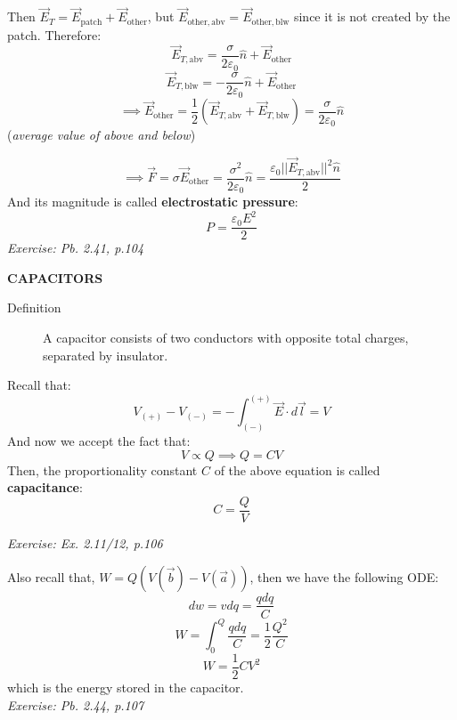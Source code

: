\documentclass[12pt,a4paper,twoside]{article}
\numberwithin{equation}{section}
\begin{document}
    \noindent Then \(\overrightarrow{E}_T=\overrightarrow{E}_{\mathrm{patch}}+\overrightarrow{E}_{\mathrm{other}}\), but \(\overrightarrow{E}_{\mathrm{other,abv}}=\overrightarrow{E}_{\mathrm{other,blw}}\) since it is not created by the patch. Therefore:
    \[\overrightarrow{E}_{T,\mathrm{abv}}=\frac{\sigma}{2\varepsilon_0}\hat{n}+\overrightarrow{E}_{\mathrm{other}}\]
    \[\overrightarrow{E}_{T,\mathrm{blw}}=-\frac{\sigma}{2\varepsilon_0}\hat{n}+\overrightarrow{E}_{\mathrm{other}}\]
    \[\implies \overrightarrow{E}_{\mathrm{other}}=\frac{1}{2}(\overrightarrow{E}_{T,\mathrm{abv}}+\overrightarrow{E}_{T,\mathrm{blw}})=\frac{\sigma}{2\varepsilon_0}\hat{n}\]
    (\textit{average value of above and below})
    
    \[\implies \overrightarrow{F}=\sigma\overrightarrow{E}_{\mathrm{other}}=\frac{\sigma^2}{2\varepsilon_0}\hat{n}=\frac{\varepsilon_0||\overrightarrow{E}_{T,\mathrm{abv}}||^2\hat{n}}{2}\]
    And its magnitude is called \textbf{electrostatic pressure}:
    \begin{equation}
        P=\frac{\varepsilon_0E^2}{2}
    \end{equation}
    \textit{Exercise: Pb. 2.41, p.104}\\
    \newline
    
    \noindent \textbf{CAPACITORS}
    \begin{description}
        \item[Definition] A capacitor consists of two conductors with opposite total charges, separated by insulator.
    \end{description}
    Recall that:
    \[V_{(+)}-V_{(-)}=-\int_{(-)}^{(+)}\overrightarrow{E}\cdot d\overrightarrow{l}=V\]
    And now we accept the fact that:
    \[V\propto Q\implies Q=CV\]
    Then, the proportionality constant $C$ of the above equation is called \textbf{capacitance}:
    \begin{equation}
        C=\frac{Q}{V}
        \label{eq:capacitance}
    \end{equation}
    
    \textit{Exercise: Ex. 2.11/12, p.106}\\
    \newline
    
    \noindent Also recall that, $W=Q(V(\overrightarrow{b})-V(\overrightarrow{a}))$, then we have the following ODE:
    \[dw=vdq=\frac{qdq}{C}\]
    \[W=\int_0^Q\frac{qdq}{C}=\frac{1}{2}\frac{Q^2}{C}\]
    \begin{equation}
        W=\frac{1}{2}CV^2
        \label{eq: Capacitor-energy}
    \end{equation}
    which is the energy stored in the capacitor.\\
    \noindent\textit{Exercise: Pb. 2.44, p.107}
\newpage
\end{document}
